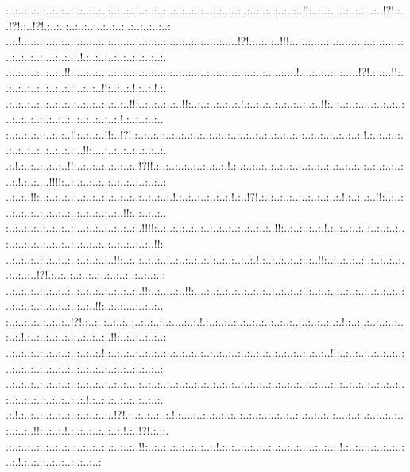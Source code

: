\documentclass[paper=a4, fontsize=11pt]{scrartcl} %
\numberwithin{equation}{section} %
\numberwithin{figure}{section} %
\numberwithin{table}{section} %
\begin{document}
:..:..:..:..:..:..:..:..:..:..:..:..:..:..:..:..:..:..:..:..:..:..:..:..:..:..:..:..:..:..:..:..!!:..:..:..:..:..:..:..:..!?!.:..!?!.:..!?!.:..:..:..:..:..:..:..:..:..:..:..:..:..:\\..:.!.:..:..:..:..:..:..:..:..:..:..:..:..:..:..:..:..:..:..:..:..:..:..:..!?!.:..:..:..!!!:..:..:..:..:..:..:..:..:..:..:..:..:..:..:..:..:....:..:..:.!.:..:..:..:..:..:..:..:..:.\\.:..:..:..:..:..:..!!:....:..:..:..:..:..:..:..:..:..:..:..:..:..:..:..:..:..:..:..:..:..:..:.!.:..:..:..:..:..:..!?!.:..:..!!:..:..:..:..:..:..:..:..:..:..:..!!:..:..:.!.:..:.!.:.\\.:..:..:..:..:..:..:..:..:..:..:..:..:..!!:..:..:..:..:..!!:..:..:..:..:..:.!.:..:..:..:..:..:..:..:..!!:..:..:..:..:..:..:..:..:..:..:..:..:..:..:..:..:..:..:..:..:.!.:..:..:..:..\\:..:..:..:..:..:..:..!!:..:..:..!!:..!?!.:..:..:..:..:..:..:..:..:..:..:..:..:..:..:..:..:..:..:..:..:..:..:..:..:.!.:..:..:..:..:..:..:..:..:..:..:..:..!!:....:..:..:..:..:..:..:.\\.:.!.:..:..:..:..:..!!:..:..:..:..:..:..:..!?!!.:..:..:..:..:..:..:..:.!.:..:..:..:..:..:..:..:..:..:..:..:..:..:..:..:..:..:..:..:.!.:..:....!!!!:..:..:..:..:..:..:..:..:..:..:..:\\..:..:..!!:..:..:..:..:..:..:..:..:..:..:..:..:..:..:.!.:..:..:..:..:..:.!.:..!?!.:..:..:..:..:..:..:..:..:.!.:..:..:..!!:..:..:..:..:..:..:..:..:..:..:..:..:..:..:..!!:..:..:..:..\\:..:..:..:..:..:..:..:....:..:..:..:..:..:..!!!!:..:..:..:..:..:..:..:..:..:..:..:..:..!!:..:..:..:..:.!.:..:..:..:..:..:..:..:..:..:..:..:..:..:..:..:..:..:..:..:..:..:..:..:..!!:\\..:..:..:..:..:..:..:..:..:..:..:..!!:..:..:..:..:..:..:..:..:..:..:..:..:..:..:.!.:..:..:..:..:..:..!!:..:..:..:..:..:..:..:..:..:..:..:..!?!.:..:..:..:..:..:..:..:..:..:..:..:..:\\..:..:..:..:..:..:..:..:..:..:..:..:..:..:..!!:..:..:..:..!!:....:..:..:..:..:..:..:..:..:..:..:..:..:..:..:..:..:..:..:..:..:..:..:..:..:..:..:..:..:..:..:..!!:..:..:....:..:..:..\\:..:..:..:..:..:..:..!?!.:..:..:..:..:..:..:..:..:..:....:..:.!.:..:..:..:..:..:..:..:..:..:..:..:..:..:..:.!.:..:..:..:..:..:..:..:.!.:..:..:..:..:..:..:..:..:..!!:..:..:..:..:..:\\..:..:..:..:..:..:..:..:..:..:.!.:..:..:..:..:..:..:..:..:..:..:..:..:..:..:..:..:..:..:..:..:..:..:..:..!!:..:..:..:..:..:..:..:..:..:..:..:..:..:..:..:..:..:..:..:..:..:..:..:..:\\..:..:..:..:..:..:..:..:..:..:..:..:..:....:..:..:..:..:..:..:..:..:..:..:..:..:..:..:..:..:..:..:..:....:..:..:..:..:..:..:..:..:..:..:..:..:..:..:..:..:.!.:..:..:..:..:..:..:..:.\\.:.!.:..:..:..:..:..:..:..:..:..:..!?!.:..:..:..:..:.!.:....:..:..:..:..:..:..:..:..:..:..:..:..:..:..:..:....:..:..:..:..:..:..:..:..:..!!:..:..:.!.:..:..:..:..:..:.!.:..!?!.:..:.\\.:..:..:..:..:..:..:..:..:..:..:..:..:..:..!!:..:..:..:..:..:..:..:.!.:..:..:..:..:..:..:..:..:..:..:..:..:.!.:..:..:..:..:..:..:..:.!.:..:..:..:..:..:..:..:..:
\end{document}

